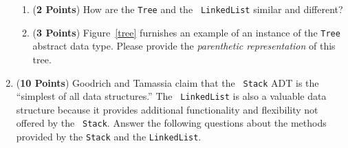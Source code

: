 \documentclass[12pt]{article}
\begin{document}
\begin{enumerate}
\begin{enumerate}



  \item ({\bf 2 Points}) How are the {\tt Tree} and the {\tt
    LinkedList} similar and different?

\item ({\bf 3 Points}) Figure~\ref{tree} furnishes an example of an
  instance of the {\tt Tree} abstract data type.  Please provide the
  {\em parenthetic representation} of this tree.

\end{enumerate}

\newpage

\item ({\bf 10 Points}) Goodrich and Tamassia claim that the {\tt
  Stack} ADT is the ``simplest of all data structures.''  The {\tt
  LinkedList} is also a valuable data structure because it provides
  additional functionality and flexibility not offered by the {\tt
    Stack}.  Answer the following questions about the methods provided
  by the {\tt Stack} and the {\tt LinkedList}.

\begin{enumerate}


\end{enumerate}
\end{enumerate}
\end{document}

